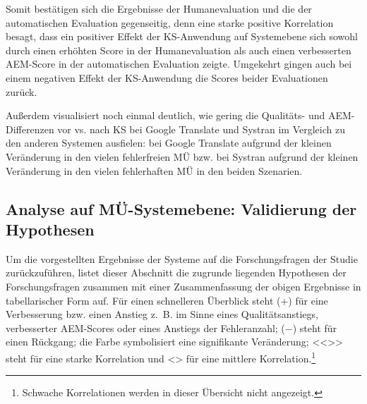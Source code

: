 Somit bestätigen sich die Ergebnisse der Humanevaluation und die der automatischen Evaluation gegenseitig, denn eine starke positive Korrelation besagt, dass ein positiver Effekt der KS-Anwendung auf Systemebene sich sowohl durch einen erhöhten Score in der Humanevaluation als auch einen verbesserten AEM-Score in der automatischen Evaluation zeigte. Umgekehrt gingen auch bei einem negativen Effekt der KS-Anwendung die Scores beider Evaluationen zurück.

Außerdem visualisiert  noch einmal deutlich, wie gering die Qualitäts- und AEM-Differenzen vor vs. nach KS bei Google Translate und Systran im Vergleich zu den anderen Systemen ausfielen: bei Google Translate aufgrund der kleinen Veränderung in den vielen fehlerfreien MÜ bzw. bei Systran aufgrund der kleinen Veränderung in den vielen fehlerhaften MÜ in den beiden Szenarien.

\subsection{Analyse auf MÜ-Systemebene: Validierung der Hypothesen}
\label{sec:5.4.10}

Um die vorgestellten Ergebnisse der Systeme auf die Forschungsfragen der Studie zurückzuführen, listet dieser Abschnitt die zugrunde liegenden Hypothesen der Forschungsfragen zusammen mit einer Zusammenfassung der obigen Ergebnisse in tabellarischer Form auf. Für einen schnelleren Überblick steht (+) für eine Verbesserung bzw. einen Anstieg z.~B. im Sinne eines Qualitätsanstiegs, verbesserter AEM-Scores oder eines Anstiegs der Fehleranzahl; ($-$) steht für einen Rückgang; die  Farbe symbolisiert eine signifikante Veränderung; <{}<{}>{}> steht für eine starke Korrelation und <> für eine mittlere Korrelation.\footnote{\textrm{Schwache Korrelationen werden in dieser Übersicht nicht angezeigt.}}

